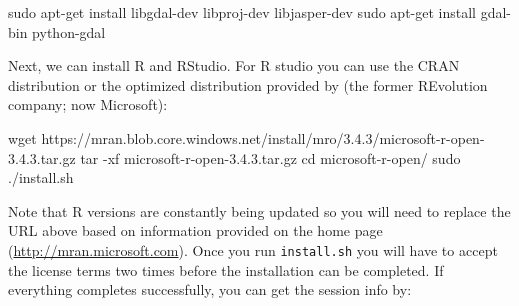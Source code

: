 \documentclass[graybox,natbib,nospthms,UStrade]{svmono}
\newenvironment{Shaded}{\begin{snugshade}}{\end{snugshade}}
\newcommand{\BuiltInTok}[1]{#1}
\newcommand{\FunctionTok}[1]{\textcolor[rgb]{0,0,0}{#1}}
\newcommand{\NormalTok}[1]{#1}
\begin{document}
\begin{Shaded}
\begin{Highlighting}[]
\FunctionTok{sudo}\NormalTok{ apt-get install libgdal-dev libproj-dev libjasper-dev}
\FunctionTok{sudo}\NormalTok{ apt-get install gdal-bin python-gdal}
\end{Highlighting}
\end{Shaded}

Next, we can install R and RStudio. For R studio you can use the CRAN distribution or the optimized distribution provided by (the former REvolution company; now Microsoft):

\begin{Shaded}
\begin{Highlighting}[]
\FunctionTok{wget}\NormalTok{ https://mran.blob.core.windows.net/install/mro/3.4.3/microsoft-r-open-3.4.3.tar.gz}
\FunctionTok{tar}\NormalTok{ -xf microsoft-r-open-3.4.3.tar.gz}
\BuiltInTok{cd}\NormalTok{ microsoft-r-open/}
\FunctionTok{sudo}\NormalTok{ ./install.sh}
\end{Highlighting}
\end{Shaded}

Note that R versions are constantly being updated so you will need to replace the URL above based on information provided on the home page (\url{http://mran.microsoft.com}). Once you run \texttt{install.sh} you will have to accept the license terms two times before the installation can be completed. If everything completes successfully, you can get the session info by:
\end{document}

